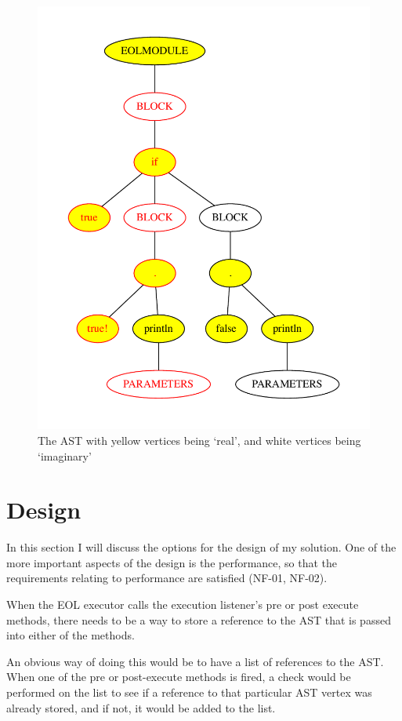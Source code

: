 \begin{figure}
	\centering
	\includegraphics[scale=0.3]{figures/ifElseRealAST.pdf}
	\caption{The AST with yellow vertices being `real', and white vertices being `imaginary'}
	\label{fig:ifElseASTreal}
\end{figure}

\section{Design}

In this section I will discuss the options for the design of my solution. One of the more important aspects of the design is the performance, so that the requirements relating to performance are satisfied (NF-01, NF-02).

When the EOL executor calls the execution listener's pre or post execute methods, there needs to be a way to store a reference to the AST that is passed into either of the methods.

An obvious way of doing this would be to have a list of references to the AST. When one of the pre or post-execute methods is fired, a check would be performed on the list to see if a reference to that particular AST vertex was already stored, and if not, it would be added to the list.

